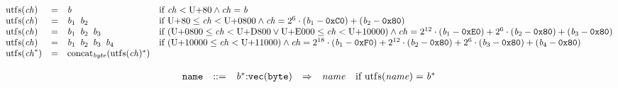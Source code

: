 \vspace{1ex}

$$
\begin{array}{@{}lcl@{}l@{}}
{\mathrm{utf{\scriptstyle8}}}({\mathit{ch}}) &=& {\mathit{b}} &\quad
  \mbox{if}~{\mathit{ch}} < \mathrm{U{+}80} \land {\mathit{ch}} = {\mathit{b}} \\
{\mathrm{utf{\scriptstyle8}}}({\mathit{ch}}) &=& {\mathit{b}}_{{1}}~\,{\mathit{b}}_{{2}} &\quad
  \mbox{if}~\mathrm{U{+}80} \leq {\mathit{ch}} < \mathrm{U{+}0800} \land {\mathit{ch}} = {2^{6}} \cdot ({\mathit{b}}_{{1}} - \mathtt{0xC0}) + ({\mathit{b}}_{{2}} - \mathtt{0x80}) \\
{\mathrm{utf{\scriptstyle8}}}({\mathit{ch}}) &=& {\mathit{b}}_{{1}}~\,{\mathit{b}}_{{2}}~\,{\mathit{b}}_{{3}} &\quad
  \mbox{if}~(\mathrm{U{+}0800} \leq {\mathit{ch}} < \mathrm{U{+}D800} \lor \mathrm{U{+}E000} \leq {\mathit{ch}} < \mathrm{U{+}10000}) \land {\mathit{ch}} = {2^{12}} \cdot ({\mathit{b}}_{{1}} - \mathtt{0xE0}) + {2^{6}} \cdot ({\mathit{b}}_{{2}} - \mathtt{0x80}) + ({\mathit{b}}_{{3}} - \mathtt{0x80}) \\
{\mathrm{utf{\scriptstyle8}}}({\mathit{ch}}) &=& {\mathit{b}}_{{1}}~\,{\mathit{b}}_{{2}}~\,{\mathit{b}}_{{3}}~\,{\mathit{b}}_{{4}} &\quad
  \mbox{if}~(\mathrm{U{+}10000} \leq {\mathit{ch}} < \mathrm{U{+}11000}) \land {\mathit{ch}} = {2^{18}} \cdot ({\mathit{b}}_{{1}} - \mathtt{0xF0}) + {2^{12}} \cdot ({\mathit{b}}_{{2}} - \mathtt{0x80}) + {2^{6}} \cdot ({\mathit{b}}_{{3}} - \mathtt{0x80}) + ({\mathit{b}}_{{4}} - \mathtt{0x80}) \\
{\mathrm{utf{\scriptstyle8}}}({{\mathit{ch}}^\ast}) &=& {{\mathrm{concat}}}_{{\mathit{byte}}}({{\mathrm{utf{\scriptstyle8}}}({\mathit{ch}})^\ast}) &  \\
\end{array}
$$

$$
\begin{array}{@{}l@{}rrlll@{}l@{}}
& {\mathtt{name}} &::=& {{\mathit{b}}^\ast}{:}{\mathtt{vec}}({\mathtt{byte}}) &\Rightarrow& {\mathit{name}} &\quad
  \mbox{if}~{\mathrm{utf{\scriptstyle8}}}({\mathit{name}}) = {{\mathit{b}}^\ast} \\
\end{array}
$$

\vspace{1ex}


